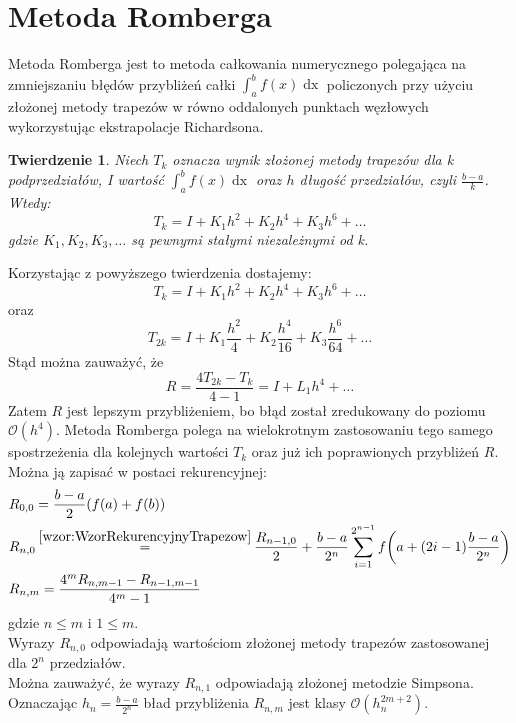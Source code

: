 \documentclass[11pt,wide]{article}
\newcommand\numeq[1]%
  {\stackrel{\scriptscriptstyle \mkern-1.5mu#1\mkern-1.5mu }{=}}
\newtheorem{thm}{Twierdzenie}
\begin{document}
\section{Metoda Romberga}
Metoda Romberga jest to metoda całkowania numerycznego polegająca na zmniejszaniu błędów przybliżeń całki \(\int_a^b f(x)\mathop{dx}\) policzonych przy użyciu złożonej metody trapezów w równo oddalonych punktach węzłowych wykorzystując ekstrapolacje Richardsona.
\\
\begin{thm} \label{tw:BladTrapezow}
Niech \(T_k\) oznacza wynik złożonej metody trapezów dla k podprzedziałów, I wartość  \(\int_a^b f(x)\mathop{dx}\) oraz \(h\) długość przedziałów, czyli \(\frac{b-a}{k}\). Wtedy:
\begin{equation}
T_k = I + K_1 h^2 + K_2 h^4 + K_3 h^6 + \ldots
\end{equation}
gdzie \(K_1, K_2, K_3, \ldots \) są pewnymi stałymi niezależnymi od k.
\end{thm}
Korzystając z powyższego twierdzenia dostajemy:
\begin{equation}
T_k = I + K_1 h^2 + K_2 h^4 + K_3 h^6 + \ldots
\end{equation}
oraz
\begin{equation}
T_{2k} = I + K_1 \frac{h^2}{4} + K_2 \frac{h^4}{16} + K_3 \frac{h^6}{64} + \ldots
\end{equation}
Stąd można zauważyć, że
\begin{equation}
R = \frac{4T_{2k} - T_k}{4 - 1} = I + L_1 h^4 + \ldots
\end{equation}
Zatem \(R\) jest lepszym przybliżeniem, bo błąd został zredukowany do poziomu \(\mathcal{O}(h^4)\). Metoda Romberga polega na wielokrotnym zastosowaniu tego samego spostrzeżenia dla kolejnych wartości \(T_k\) oraz już ich poprawionych przybliżeń \(R\). Można ją zapisać w postaci rekurencyjnej:
\begin{align}
& R_{0,0} = \frac{b - a}{2} (f(a) + f(b))\\
& R_{n, 0} \numeq{\eqref{wzor:WzorRekurencyjnyTrapezow}} \frac{R_{n-1, 0}}{2} + \frac{b-a}{2^n} \sum_{i=1}^{2^{n-1}}f\bigg(a+(2i-1) \frac{b-a}{2^n}\bigg) \\
& R_{n, m} = \frac{4^m R_{n, m-1} - R_{n-1, m-1}}{4^m - 1}
\end{align}
gdzie \(n \leq m\) i \(1 \leq m\). \\ 
Wyrazy \(R_{n,0}\) odpowiadają wartościom złożonej metody trapezów zastosowanej dla \(2^n\) przedziałów.\\
Można zauważyć, że wyrazy \(R_{n, 1}\) odpowiadają złożonej metodzie Simpsona.\\
Oznaczając \(h_n = \frac{b-a}{2^n}\) bład przybliżenia \(R_{n,m}\) jest klasy \(\mathcal{O}(h_n^{2m+2})\).
\end{document}
